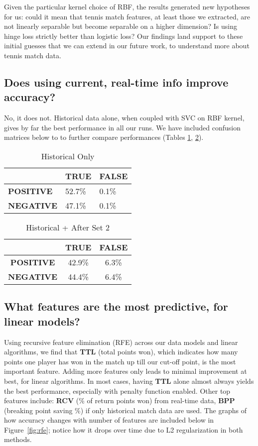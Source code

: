 \documentclass[paper=a4, fontsize=10pt]{scrartcl} %
\numberwithin{equation}{section} %
\numberwithin{figure}{section} %
\numberwithin{table}{section} %
\begin{document}
Given the particular kernel choice of RBF, the results generated new hypotheses for us: could it mean that tennis match features, at least those we extracted, are not linearly separable but become separable on a higher dimension? Is using hinge loss strictly better than logistic loss? Our findings land support to these initial guesses that we can extend in our future work, to understand more about tennis match data. 
\subsection{Does using current, real-time info improve accuracy?}
No, it does not. Historical data alone, when coupled with SVC on RBF kernel, gives by far the best performance in all our runs. We have included confusion matrices below to to further compare performances (Tables \ref{tab:h1}, \ref{tab:h4}). 
\begin{table}[h]
\caption{Historical Only}
\label{tab:h1}
\begin{tabular}{ l | l | l}
    \hline
    & \textbf{TRUE} & \textbf{FALSE}  \\ \hline
   \textbf{POSITIVE} &  52.7\% & 0.1\%  \\ \hline
   \textbf{NEGATIVE} & 47.1\% & 0.1\%  \\ \hline
\end{tabular}
\end{table}
\begin{table}[h]
\caption{Historical + After Set 2}
\label{tab:h4}
\begin{tabular}{ c | c | c}
    \hline
    & \textbf{TRUE} & \textbf{FALSE}  \\ \hline
   \textbf{POSITIVE} &  42.9\% & 6.3\%  \\ \hline
   \textbf{NEGATIVE} &44.4\% & 6.4\%  \\ \hline
\end{tabular}
\end{table}

\subsection{What features are the most predictive, for linear models?}
Using recursive feature elimination (RFE) across our data models and linear algorithms, we find that \textbf{TTL} (total points won), which indicates how many points one player has won in the match up till our cut-off point, is the most important feature. Adding more features only leads to minimal improvement at best, for linear algorithms. In most cases, having \textbf{TTL} alone almost always yields the best performance, especially with penalty function enabled. Other top features include: \textbf{RCV} (\% of return points won) from real-time data, \textbf{BPP} (breaking point saving \%) if only historical match data are used. 
The graphs of how accuracy changes with number of features are included below in Figure~\ref{fig:rfe}; notice how it drops over time due to L2 regularization in both methods. 
\end{document}
